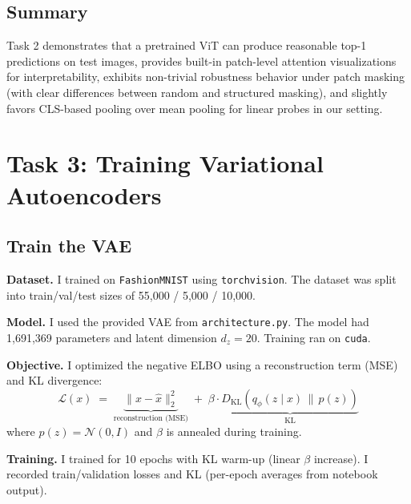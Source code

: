 \documentclass{article}
\begin{document}
\subsection{Summary}
Task 2 demonstrates that a pretrained ViT can produce reasonable top-1 predictions on test images, provides built-in patch-level attention visualizations for interpretability, exhibits non-trivial robustness behavior under patch masking (with clear differences between random and structured masking), and slightly favors CLS-based pooling over mean pooling for linear probes in our setting.


\newpage
\section{Task 3: Training Variational Autoencoders}

\subsection{Train the VAE}

\textbf{Dataset.} I trained on \texttt{FashionMNIST} using \texttt{torchvision}. The dataset was split into train/val/test sizes of 55,000 / 5,000 / 10,000.

\textbf{Model.} I used the provided VAE from \texttt{architecture.py}. The model had 1,691,369 parameters and latent dimension $d_z=20$. Training ran on \texttt{cuda}.

\textbf{Objective.} I optimized the negative ELBO using a reconstruction term (MSE) and KL divergence:
\[
\mathcal{L}(x) \;=\; \underbrace{\|x-\hat{x}\|_2^2}_{\text{reconstruction (MSE)}} \;+\; \beta \cdot 
\underbrace{D_{\mathrm{KL}}\!\left(q_\phi(z\mid x)\,\|\,p(z)\right)}_{\text{KL}}
\]
where $p(z)=\mathcal{N}(0,I)$ and $\beta$ is annealed during training.

\textbf{Training.} I trained for 10 epochs with KL warm-up (linear $\beta$ increase). I recorded train/validation losses and KL (per-epoch averages from notebook output).
\end{document}
